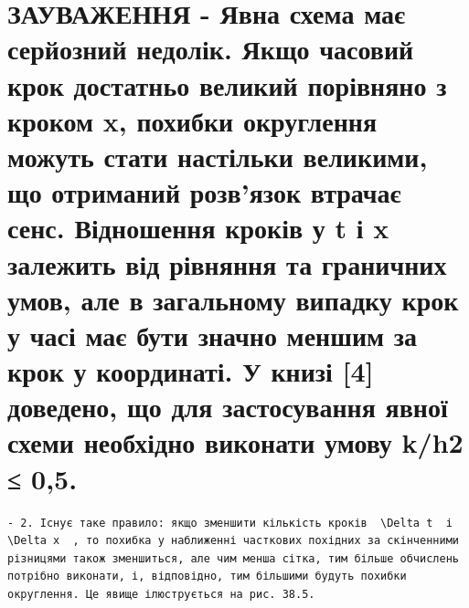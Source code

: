 \documentclass[
  ukrainian,
]{article}
\begin{document}
\section{ЗАУВАЖЕННЯ - Явна схема має серйозний недолік. Якщо часовий
крок достатньо великий порівняно з кроком x, похибки округлення можуть
стати настільки великими, що отриманий розв'язок втрачає сенс.
Відношення кроків у t і x залежить від рівняння та граничних умов, але в
загальному випадку крок у часі має бути значно меншим за крок у
координаті. У книзі {[}4{]} доведено, що для застосування явної схеми
необхідно виконати умову k/h2 ≤
0,5.}\label{ux437ux430ux443ux432ux430ux436ux435ux43dux43dux44f---ux44fux432ux43dux430-ux441ux445ux435ux43cux430-ux43cux430ux454-ux441ux435ux440ux439ux43eux437ux43dux438ux439-ux43dux435ux434ux43eux43bux456ux43a.-ux44fux43aux449ux43e-ux447ux430ux441ux43eux432ux438ux439-ux43aux440ux43eux43a-ux434ux43eux441ux442ux430ux442ux43dux44cux43e-ux432ux435ux43bux438ux43aux438ux439-ux43fux43eux440ux456ux432ux43dux44fux43dux43e-ux437-ux43aux440ux43eux43aux43eux43c-x-ux43fux43eux445ux438ux431ux43aux438-ux43eux43aux440ux443ux433ux43bux435ux43dux43dux44f-ux43cux43eux436ux443ux442ux44c-ux441ux442ux430ux442ux438-ux43dux430ux441ux442ux456ux43bux44cux43aux438-ux432ux435ux43bux438ux43aux438ux43cux438-ux449ux43e-ux43eux442ux440ux438ux43cux430ux43dux438ux439-ux440ux43eux437ux432ux44fux437ux43eux43a-ux432ux442ux440ux430ux447ux430ux454-ux441ux435ux43dux441.-ux432ux456ux434ux43dux43eux448ux435ux43dux43dux44f-ux43aux440ux43eux43aux456ux432-ux443-t-ux456-x-ux437ux430ux43bux435ux436ux438ux442ux44c-ux432ux456ux434-ux440ux456ux432ux43dux44fux43dux43dux44f-ux442ux430-ux433ux440ux430ux43dux438ux447ux43dux438ux445-ux443ux43cux43eux432-ux430ux43bux435-ux432-ux437ux430ux433ux430ux43bux44cux43dux43eux43cux443-ux432ux438ux43fux430ux434ux43aux443-ux43aux440ux43eux43a-ux443-ux447ux430ux441ux456-ux43cux430ux454-ux431ux443ux442ux438-ux437ux43dux430ux447ux43dux43e-ux43cux435ux43dux448ux438ux43c-ux437ux430-ux43aux440ux43eux43a-ux443-ux43aux43eux43eux440ux434ux438ux43dux430ux442ux456.-ux443-ux43aux43dux438ux437ux456-4-ux434ux43eux432ux435ux434ux435ux43dux43e-ux449ux43e-ux434ux43bux44f-ux437ux430ux441ux442ux43eux441ux443ux432ux430ux43dux43dux44f-ux44fux432ux43dux43eux457-ux441ux445ux435ux43cux438-ux43dux435ux43eux431ux445ux456ux434ux43dux43e-ux432ux438ux43aux43eux43dux430ux442ux438-ux443ux43cux43eux432ux443-kh2-05.}

\begin{verbatim}
- 2. Існує таке правило: якщо зменшити кількість кроків  \Delta t  і  \Delta x  , то похибка у наближенні часткових похідних за скінченними різницями також зменшиться, але чим менша сітка, тим більше обчислень потрібно виконати, і, відповідно, тим більшими будуть похибки округлення. Це явище ілюструється на рис. 38.5.
\end{verbatim}
\end{document}
